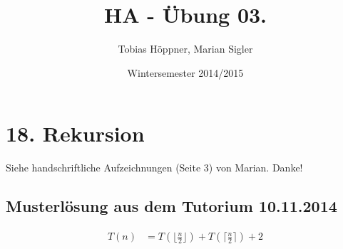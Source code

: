 \documentclass[ngerman,a4paper]{report}
\author{Tobias Höppner, Marian Sigler}
\title{HA - Übung 03. }
\date{Wintersemester 2014/2015}
\renewcommand{\maketitle}{}
\begin{document}
 
\maketitle 
\section*{18. Rekursion}
Siehe handschriftliche Aufzeichnungen (Seite 3) von Marian. Danke!

\subsection*{Musterlösung aus dem Tutorium 10.11.2014}

\begin{align*}
T(n) &= T(\lfloor \frac{n}{2} \rfloor) + T(\lceil \frac{n}{2} \rceil) +2\\
\end{align*}
\end{document}
